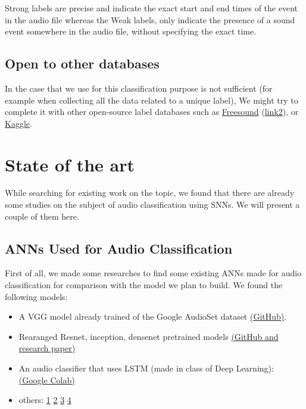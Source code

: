 \documentclass[11pt]{article}
\begin{document}
Strong labels are precise and indicate the exact start and end times of the event in the audio file whereas the Weak labels, only indicate the presence of a sound event somewhere in the audio file, without specifying the exact time. 

\subsection{Open to other databases}

In the case that we use for this classification purpose is not sufficient (for example when collecting all the data related to a unique label), We might try to complete it with other open-source label databases such as \href{https://www.freesound.org/}{Freesound} (\href{https://urbansounddataset.weebly.com/}{link2}), or \href{https://www.kaggle.com/}{Kaggle}.

\section{State of the art}

While searching for existing work on the topic, we found that there are already some studies on the subject of audio classification using SNNs. We will present a couple of them here.
\subsection{ANNs Used for Audio Classification}

First of all, we made some researches to find some existing ANNs made for audio classification for comparison with the model we plan to build.
We found the following models: 
\begin{itemize}
  \item A VGG model already trained of the Google AudioSet dataset \hyperref[item:vgg-audioset_audioset]{(GitHub)}.
  \item Rearanged Resnet, inception, densenet pretrained models \hyperref[rethink-CNN-for-audio-classification]{(GitHub and research paper)}
  \item An audio classifier that uses LSTM (made in class of Deep Learning): \hyperref[item:lstm-audio-classification]{(Google Colab)}
  \item others: \href{https://medium.com/@aakash__/classifying-audio-using-pytorch-84861f3505ea}{1} \href{https://learn.microsoft.com/en-us/training/modules/intro-audio-classification-pytorch/4-speech-model}{2} \href{https://github.com/yeyupiaoling/AudioClassification-Pytorch}{3} \href{https://github.com/IBM/audioset-classification}{4}
\end{itemize}
\end{document}
